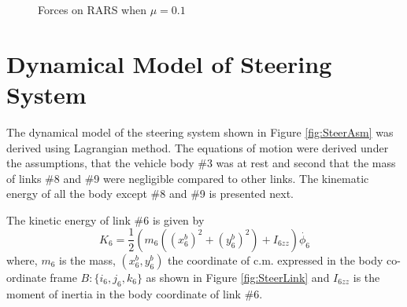 {\begin{figure}
\begin{minipage}[t]{0.5\textwidth}
		\caption{Forces on RARS when $\mu=0.1$ }\label{fig:ForcesMu1}
	\end{minipage}
\end{figure}
\section{Dynamical Model of Steering System}
The dynamical model of the steering system shown in Figure \ref{fig:SteerAsm} was derived  using Lagrangian method. The equations of motion were derived under the assumptions,  that the vehicle body \#3 was at rest and second that the mass of links \#8 and \#9 were negligible compared to other links. The kinematic energy of all the body except \#8 and \#9 is presented next.


 


The kinetic energy of link  \#6 is given by
\begin{equation}
 K_6=\frac{1}{2}(m_6((x^b_6)^2+(y^b_6)^2)+I_{6zz})\dot{\phi_6}
\end{equation}
 where, $m_6$ is the mass, $(x^b_6,y^b_6)$  the coordinate of c.m.  expressed  in the body co-ordinate frame $B:\{i_6,j_6,k_6\}$ as shown in Figure \ref{fig:SteerLink} and $I_{6zz}$ is the moment of inertia in the body coordinate of link \#6.
 
}
